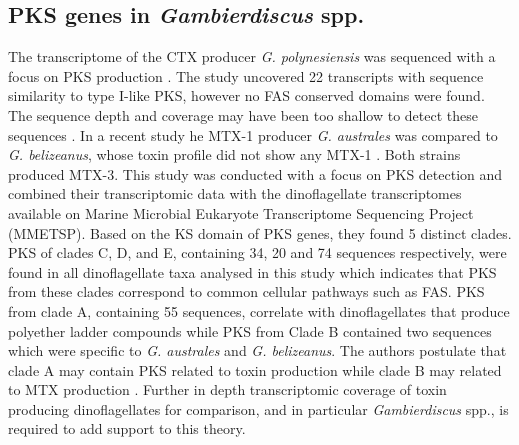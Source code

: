 \documentclass[12pt]{article}
\begin{document}
\subsection{PKS genes in \emph{Gambierdiscus} spp.}
The transcriptome of the CTX producer \emph{G. polynesiensis} was sequenced with a focus on PKS production \cite{pawlowiez2014transcriptome}. The study uncovered 22 transcripts with sequence similarity to type I-like PKS, however no FAS conserved domains were found. The sequence depth and coverage may have been too shallow to detect these sequences \cite{kohli2015polyketide}.
In a recent study he MTX-1 producer \emph{G. australes} was compared to \emph{G. belizeanus}, whose toxin profile did not show any MTX-1 \cite{kohli2015polyketide}. Both strains produced MTX-3. This study was conducted with a focus on PKS detection and combined their transcriptomic data with the dinoflagellate transcriptomes available on Marine Microbial Eukaryote Transcriptome Sequencing Project (MMETSP). Based on the KS domain of PKS genes, they found 5 distinct clades. PKS of clades C, D, and E, containing 34, 20 and 74 sequences respectively, were found in all dinoflagellate taxa analysed in this study which indicates that PKS from these clades correspond to common cellular pathways such as FAS. PKS from clade A, containing 55 sequences, correlate with dinoflagellates that produce polyether ladder compounds while PKS from Clade B contained two sequences which were specific to \emph{G. australes} and \emph{G. belizeanus}. The authors postulate that clade A may contain PKS related to toxin production while clade B may related to MTX production \cite{kohli2015polyketide}. Further in depth transcriptomic coverage of toxin producing dinoflagellates for comparison, and in particular \emph{Gambierdiscus} spp., is required to add support to this theory.
\end{document}
